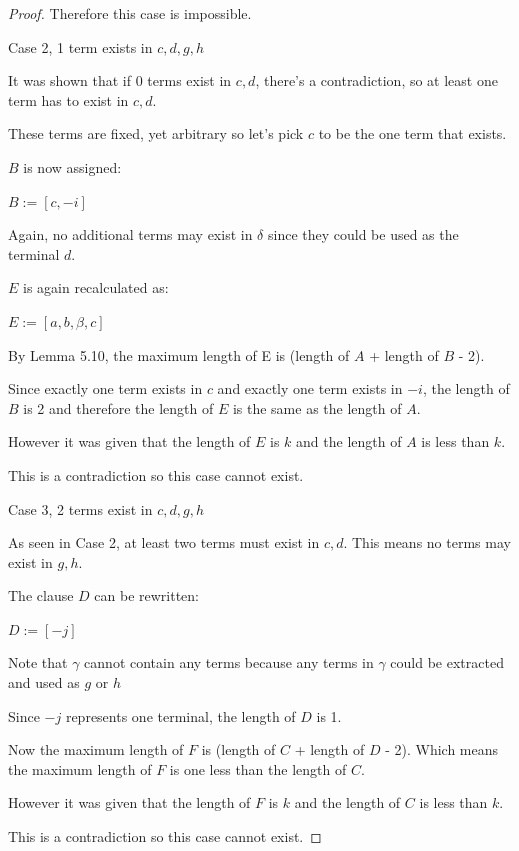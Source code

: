 \documentclass[manuscript]{acmart}
\begin{document}
\begin{proof}
        Therefore this case is impossible.

        Case 2, 1 term exists in {$c, d, g, h$}

        It was shown that if 0 terms exist in {$c, d$}, there's a contradiction, 
        so at least one term has to exist in {$c, d$}.

        These terms are fixed, yet arbitrary so let's pick $c$ to be the one term that exists.

        $B$ is now assigned:

        $B := [c, -i]$

        Again, no additional terms may exist in $\delta$ since they could
        be used as the terminal $d$.

        $E$ is again recalculated as:

        $E := [a, b, \beta, c]$

        By Lemma 5.10, the maximum length of E is 
        (length of $A$ + length of $B$ - 2).

        Since exactly one term exists in $c$ and exactly one term exists in $-i$,
        the length of $B$ is 2 and therefore the length of $E$ is the same
        as the length of $A$.

        However it was given that the length of $E$ is $k$ and the length of 
        $A$ is less than $k$.

        This is a contradiction so this case cannot exist.

        Case 3, 2 terms exist in {$c, d, g, h$}

        As seen in Case 2, at least two terms must exist in {$c, d$}. This
        means no terms may exist in {$g, h$}.

        The clause $D$ can be rewritten:

        $D := [-j]$

        Note that $\gamma$ cannot contain any terms because any terms in
        $\gamma$ could be extracted and used as $g$ or $h$

        Since $-j$ represents one terminal, the length of $D$ is 1.

        Now the maximum length of $F$ is (length of $C$ + length of $D$ - 2).
        Which means the maximum length of $F$ is one less than the length of $C$.

        However it was given that the length of $F$ is $k$ and the length
        of $C$ is less than $k$.

        This is a contradiction so this case cannot exist.


\end{proof}
\end{document}
